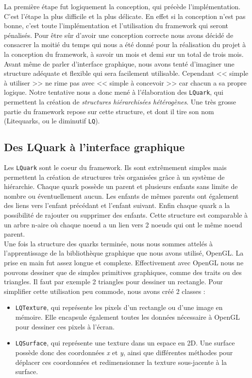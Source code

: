 \documentclass[twoside]{report}
\begin{document}
La première étape fut logiquement la conception, qui précède l'implémentation. C'est l'étape la plus difficile et la plus délicate. En effet si la conception n'est pas bonne, c'est toute l'implémentation et l'utilisation du framework qui seront pénalisés. Pour être sûr d'avoir une conception correcte nous avons décidé de consacrer la moitié du temps qui nous a été donné pour la réalisation du projet à la conception du framework, à savoir un mois et demi sur un total de trois mois.\\

Avant même de parler d'interface graphique, nous avons tenté d'imaginer une structure adéquate et flexible qui sera facilement utilisable. Cependant << simple à utiliser >> ne rime pas avec << simple à concevoir >> car chacun a sa propre logique. Notre tentative nous a donc mené à l'élaboration des \verb!LQuark!, qui permettent la création de \textit{structures hiérarchisées hétérogènes}. Une très grosse partie du framework repose sur cette structure, et dont il tire son nom (Litequarks, ou le diminutif \verb!LQ!).\\

\subsection{Des LQuark à l'interface graphique}

Les \verb!LQuark! sont le coeur du framework. Ils sont extrêmement simples mais permettent la création de structures très organisées grâce à un système de hiérarchie. Chaque quark possède un parent et plusieurs enfants sans limite de nombre ou éventuellement aucun. Les enfants de mêmes parents ont également des liens vers l'enfant précédant et l'enfant suivant. Enfin chaque quark a la possibilité de rajouter ou supprimer des enfants. Cette structure est comparable à un arbre n-aire où chaque noeud a un lien vers 2 noeuds qui ont le même noeud parent.\\

Une fois la structure des quarks terminée, nous nous sommes attelés à l'apprentissage de la bibliothèque graphique que nous avons utilisé, OpenGL. La prise en main fut assez longue et complexe. Effectivement avec OpenGL nous ne pouvons dessiner que de simples primitives graphiques, comme des traits ou des triangles. Il faut par exemple 2 triangles pour dessiner un rectangle. Pour simplifier cette utilisation peu commode, nous avons créé 2 classes :

\begin{itemize}[label=$-$, leftmargin=1.5cm]
    \setlength\itemsep{0em}
    \item \verb!LQTexture!, qui représente les pixels d'un rectangle ou d'une image en mémoire. Elle encapsule également toutes les données nécessaire à OpenGL pour dessiner ces pixels à l'écran.
    \item \verb!LQSurface!, qui représente une texture dans un espace en 2D. Une surface possède donc des coordonnées \textit{x} et \textit{y}, ainsi que différentes méthodes pour déplacer ces coordonnées et redimensionner la texture sous-jacente à la surface.
\end{itemize}
\end{document}
